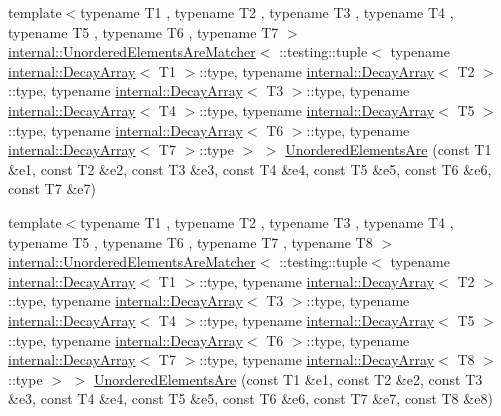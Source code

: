 \begin{DoxyCompactItemize}
{\footnotesize template$<$typename T1 , typename T2 , typename T3 , typename T4 , typename T5 , typename T6 , typename T7 $>$ }\\\hyperlink{classtesting_1_1internal_1_1UnorderedElementsAreMatcher}{internal\+::\+Unordered\+Elements\+Are\+Matcher}$<$ \+::testing\+::tuple$<$ typename \hyperlink{structtesting_1_1internal_1_1DecayArray}{internal\+::\+Decay\+Array}$<$ T1 $>$\+::type, typename \hyperlink{structtesting_1_1internal_1_1DecayArray}{internal\+::\+Decay\+Array}$<$ T2 $>$\+::type, typename \hyperlink{structtesting_1_1internal_1_1DecayArray}{internal\+::\+Decay\+Array}$<$ T3 $>$\+::type, typename \hyperlink{structtesting_1_1internal_1_1DecayArray}{internal\+::\+Decay\+Array}$<$ T4 $>$\+::type, typename \hyperlink{structtesting_1_1internal_1_1DecayArray}{internal\+::\+Decay\+Array}$<$ T5 $>$\+::type, typename \hyperlink{structtesting_1_1internal_1_1DecayArray}{internal\+::\+Decay\+Array}$<$ T6 $>$\+::type, typename \hyperlink{structtesting_1_1internal_1_1DecayArray}{internal\+::\+Decay\+Array}$<$ T7 $>$\+::type $>$ $>$ \hyperlink{namespacetesting_add6e16fe24c45e39e92c0d19c04acf11}{Unordered\+Elements\+Are} (const T1 \&e1, const T2 \&e2, const T3 \&e3, const T4 \&e4, const T5 \&e5, const T6 \&e6, const T7 \&e7)
\item 
{\footnotesize template$<$typename T1 , typename T2 , typename T3 , typename T4 , typename T5 , typename T6 , typename T7 , typename T8 $>$ }\\\hyperlink{classtesting_1_1internal_1_1UnorderedElementsAreMatcher}{internal\+::\+Unordered\+Elements\+Are\+Matcher}$<$ \+::testing\+::tuple$<$ typename \hyperlink{structtesting_1_1internal_1_1DecayArray}{internal\+::\+Decay\+Array}$<$ T1 $>$\+::type, typename \hyperlink{structtesting_1_1internal_1_1DecayArray}{internal\+::\+Decay\+Array}$<$ T2 $>$\+::type, typename \hyperlink{structtesting_1_1internal_1_1DecayArray}{internal\+::\+Decay\+Array}$<$ T3 $>$\+::type, typename \hyperlink{structtesting_1_1internal_1_1DecayArray}{internal\+::\+Decay\+Array}$<$ T4 $>$\+::type, typename \hyperlink{structtesting_1_1internal_1_1DecayArray}{internal\+::\+Decay\+Array}$<$ T5 $>$\+::type, typename \hyperlink{structtesting_1_1internal_1_1DecayArray}{internal\+::\+Decay\+Array}$<$ T6 $>$\+::type, typename \hyperlink{structtesting_1_1internal_1_1DecayArray}{internal\+::\+Decay\+Array}$<$ T7 $>$\+::type, typename \hyperlink{structtesting_1_1internal_1_1DecayArray}{internal\+::\+Decay\+Array}$<$ T8 $>$\+::type $>$ $>$ \hyperlink{namespacetesting_a0f30358234947d21c7f39f15a8395d04}{Unordered\+Elements\+Are} (const T1 \&e1, const T2 \&e2, const T3 \&e3, const T4 \&e4, const T5 \&e5, const T6 \&e6, const T7 \&e7, const T8 \&e8)

\end{DoxyCompactItemize}
